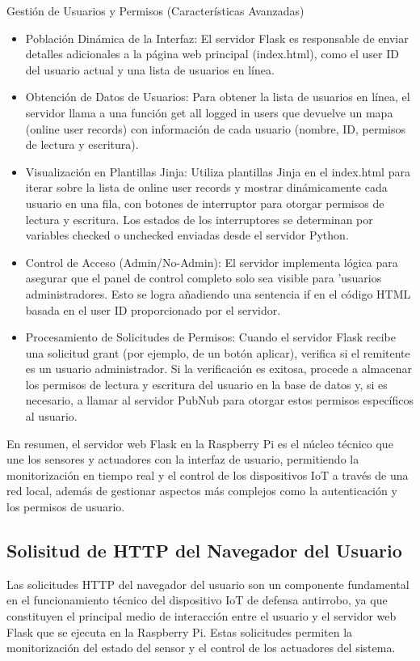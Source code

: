 \documentclass{report}
\begin{document}
Gestión de Usuarios y Permisos (Características Avanzadas)
\begin{itemize}
    \item Población Dinámica de la Interfaz: El servidor Flask es responsable de enviar detalles adicionales a la página web principal 
    (index.html), como el user ID del usuario actual y una lista de usuarios en línea.
    \item Obtención de Datos de Usuarios: Para obtener la lista de usuarios en línea, el servidor llama a una función get all logged in users 
    que devuelve un mapa (online user records) con información de cada usuario (nombre, ID, permisos de lectura y escritura).
    \item Visualización en Plantillas Jinja: Utiliza plantillas Jinja en el index.html para iterar sobre la lista de online user records 
    y mostrar dinámicamente cada usuario en una fila, con botones de interruptor para otorgar permisos de lectura y escritura. 
    Los estados de los interruptores se determinan por variables checked o unchecked enviadas desde el servidor Python.
    \item Control de Acceso (Admin/No-Admin): El servidor implementa lógica para asegurar que el panel de control completo solo sea 
    visible para  'usuarios administradores. Esto se logra añadiendo una sentencia if en el código HTML basada en el
     user ID proporcionado por el servidor.
    \item Procesamiento de Solicitudes de Permisos: Cuando el servidor Flask recibe una solicitud grant (por ejemplo, de un botón aplicar), 
    verifica si el remitente es un usuario administrador. Si la verificación es exitosa, procede a almacenar los permisos de lectura y 
    escritura del usuario en la base de datos y, si es necesario, a llamar al servidor PubNub para otorgar estos permisos específicos al usuario.
\end{itemize}

En resumen, el servidor web Flask en la Raspberry Pi es el núcleo técnico que une los sensores y actuadores con la interfaz de usuario, 
permitiendo la monitorización en tiempo real y el control de los dispositivos IoT a través de una red local, además de gestionar aspectos 
más complejos como la autenticación y los permisos de usuario.

\subsection{Solisitud de HTTP del Navegador del Usuario}
Las solicitudes HTTP del navegador del usuario son un componente fundamental en el funcionamiento técnico del dispositivo IoT de defensa antirrobo, 
ya que constituyen el principal medio de interacción entre el usuario y el servidor web Flask que se ejecuta en la Raspberry Pi. Estas solicitudes 
permiten la monitorización del estado del sensor y el control de los actuadores del sistema.
\end{document}
